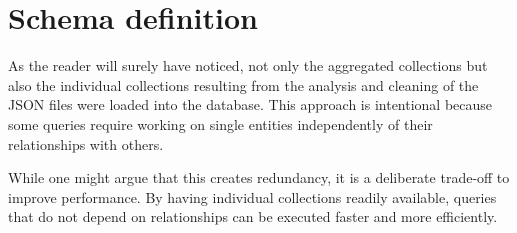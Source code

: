 \documentclass{Configuration_Files/PoliMi3i_thesis}
\begin{document}
\bigskip

\section{Schema definition}
As the reader will surely have noticed, not only the aggregated collections but also the individual collections resulting from the analysis and cleaning of the JSON files were loaded into the database. This approach is intentional because some queries require working on single entities independently of their relationships with others.

While one might argue that this creates redundancy, it is a deliberate trade-off to improve performance. By having individual collections readily available, queries that do not depend on relationships can be executed faster and more efficiently.
\end{document}
